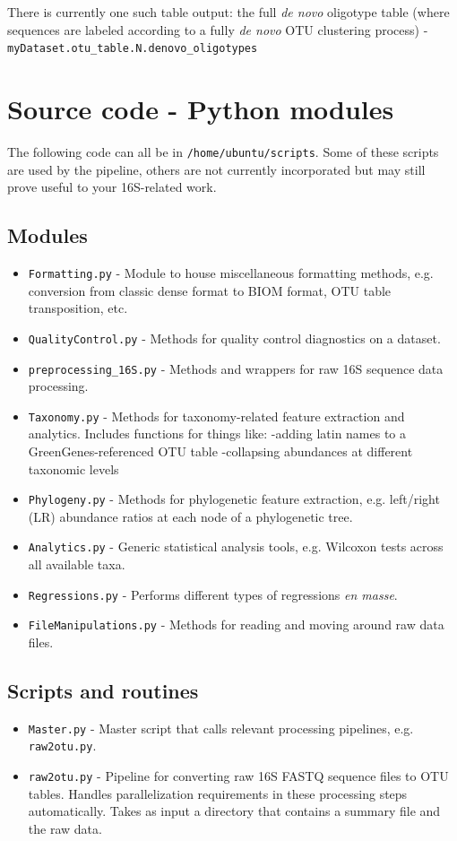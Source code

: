 \documentclass[11pt, oneside]{article}   	%
\begin{document}
There is currently one such table output: the full \textit{de novo} oligotype table (where sequences are labeled according to a fully \textit{de novo} OTU clustering process) - \\{\tt myDataset.otu\_table.N.denovo\_oligotypes}

\section{Source code - Python modules}
The following code can all be in \texttt{/home/ubuntu/scripts}. Some of these scripts
are used by the pipeline, others are not currently incorporated but may still prove
useful to your 16S-related work.

\subsection{Modules}
\begin{itemize}
  \item {\tt Formatting.py} - Module to house miscellaneous formatting methods, e.g. conversion from classic dense format to BIOM format, OTU table transposition, etc.
	\item {\tt QualityControl.py} - Methods for quality control diagnostics on a dataset.
	\item {\tt preprocessing\_16S.py} - Methods and wrappers for raw 16S sequence data processing.
	\item {\tt Taxonomy.py} - Methods for taxonomy-related feature extraction and analytics.  Includes functions for things like:
		-adding latin names to a GreenGenes-referenced OTU table
		-collapsing abundances at different taxonomic levels
	\item {\tt Phylogeny.py} - Methods for phylogenetic feature extraction, e.g. left/right (LR) abundance ratios at each node of a phylogenetic tree.
	\item {\tt Analytics.py} - Generic statistical analysis tools, e.g. Wilcoxon tests across all available taxa.
	\item {\tt Regressions.py} - Performs different types of regressions \textit{en masse}.
	\item {\tt FileManipulations.py} - Methods for reading and moving around raw data files.
\end{itemize}

\subsection{Scripts and routines}
\begin{itemize}
	\item {\tt Master.py} - Master script that calls relevant processing pipelines, e.g. {\tt raw2otu.py}.
	\item {\tt raw2otu.py} - Pipeline for converting raw 16S FASTQ sequence files to OTU tables.  Handles parallelization requirements in these processing steps automatically.  Takes as input a directory that contains a summary file and the raw data.
\end{itemize}
\end{document}
